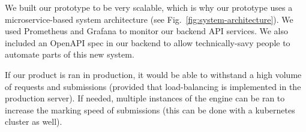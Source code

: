 \documentclass[a4paper, 12pt]{article}
\begin{document}
We built our prototype to be very scalable, which is why our prototype uses a microservice-based system architecture (see Fig.~\ref{fig:system-architecture}). We used Prometheus and Grafana to monitor our backend API services. We also included an OpenAPI spec in our backend to allow technically-savy people to automate parts of this new system.


If our product is ran in production, it would be able to withstand a high volume of requests and submissions (provided that load-balancing is implemented in the production server). If needed, multiple instances of the engine can be ran to increase the marking speed of submissions (this can be done with a kubernetes cluster as well).
\end{document}
